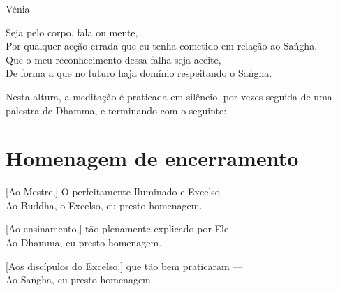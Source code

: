 \begin{instruction}
  Vénia
\end{instruction}

Seja pelo corpo, fala ou mente,\\
Por qualquer acção errada que eu tenha cometido em relação ao Saṅgha,\\
Que o meu reconhecimento dessa falha seja aceite,\\
De forma a que no futuro haja domínio respeitando o Saṅgha.

\vfill

\begin{instruction}
  Nesta altura, a meditação é praticada em silêncio, por vezes seguida de uma palestra de Dhamma, e terminando com o seguinte:
\end{instruction}

\chapter{Homenagem de encerramento}

[Ao Mestre,] O perfeitamente Iluminado e Excelso ---\\
Ao Buddha, o Excelso, eu presto homenagem. 

[Ao ensinamento,] tão plenamente explicado por Ele ---\\
Ao Dhamma, eu presto homenagem. 

[Aos discípulos do Excelso,] que tão bem praticaram ---\\
Ao Saṅgha, eu presto homenagem. 

